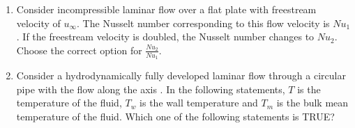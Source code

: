 \documentclass[journal]{IEEEtran}
\begin{document}
\begin{enumerate}[leftmargin=0pt]
\item
Consider incompressible laminar flow over a flat plate with freestream velocity of $u_\infty$. The Nusselt number corresponding to this flow velocity is $Nu_1$. If the freestream velocity is doubled, the Nusselt number changes to $Nu_2$. Choose the correct option for $\frac{Nu_2}{Nu_1}$.

\vspace{2mm}

\begin{enumerate}
\end{enumerate}

\hfill{}

\vspace{4mm}

\item
Consider a hydrodynamically fully developed laminar flow through a circular pipe with the flow along the axis . In the following statements, $T$ is the temperature of the fluid, $T_w$ is the wall temperature and $T_m$ is the bulk mean temperature of the fluid. Which one of the following statements is TRUE?

\vspace{2mm}

\begin{enumerate}
\end{enumerate}

\hfill{}

\vspace{4mm}


\end{enumerate}
\end{document}
